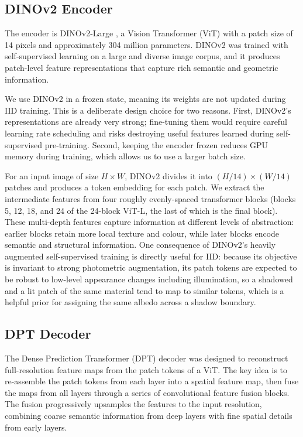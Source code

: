 \subsection{DINOv2 Encoder}

The encoder is DINOv2-Large , a Vision Transformer (ViT)
with a patch size of 14 pixels and approximately 304 million parameters.
DINOv2 was trained with self-supervised learning on a large and diverse image
corpus, and it produces patch-level feature representations that capture
rich semantic and geometric information.

We use DINOv2 in a frozen state, meaning its weights are not updated during
IID training.
This is a deliberate design choice for two reasons.
First, DINOv2's representations are already very strong; fine-tuning them would
require careful learning rate scheduling and risks destroying useful features
learned during self-supervised pre-training.
Second, keeping the encoder frozen reduces GPU memory during training, which
allows us to use a larger batch size.

For an input image of size $H \times W$, DINOv2 divides it into $(H/14) \times (W/14)$
patches and produces a token embedding for each patch.
We extract the intermediate features from four roughly evenly-spaced transformer
blocks (blocks 5, 12, 18, and 24 of the 24-block ViT-L, the last of which is the
final block).
These multi-depth features capture information at different levels of abstraction:
earlier blocks retain more local texture and colour, while later blocks encode
semantic and structural information.
One consequence of DINOv2's heavily augmented self-supervised training is
directly useful for IID: because its objective is invariant to strong
photometric augmentation, its patch tokens are expected to be robust to
low-level appearance changes including illumination, so a shadowed and a lit
patch of the same material tend to map to similar tokens, which is a helpful prior for
assigning the same albedo across a shadow boundary.

\subsection{DPT Decoder}

The Dense Prediction Transformer (DPT) decoder  was designed
to reconstruct full-resolution feature maps from the patch tokens of a ViT.
The key idea is to re-assemble the patch tokens from each layer into a spatial
feature map, then fuse the maps from all layers through a series of convolutional
feature fusion blocks.
The fusion progressively upsamples the features to the input resolution,
combining coarse semantic information from deep layers with fine spatial details
from early layers.

